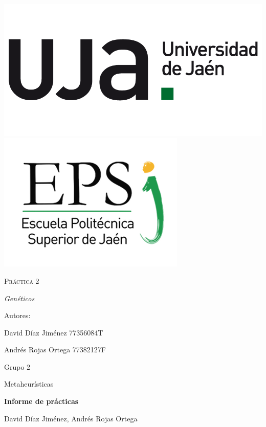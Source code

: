	\begin{titlepage}
		\centering
		{\includegraphics[scale=0.2]{img/np_UJA_generica_6.png}
		\includegraphics[scale=0.35]{img/Logo_EPS.png}}
		\vspace{1cm}
		{\scshape\Huge Práctica 2 \par}
		\vspace{3cm}
		{\itshape\Large Genéticos \par}
		\vfill
		{\Large Autores: \par}
		{\Large David Díaz Jiménez 77356084T \par}
		{\Large Andrés Rojas Ortega 77382127F\par}
		\vfill
		{\Large Grupo 2 \par}
	\end{titlepage}

	\begin{center}
	
	\begin{large}
		
		Metaheurísticas
		
	\end{large}
	
		\vspace*{0.2in}
		\textbf{\large Informe de prácticas}
		
		\vspace*{.2in}
		
		David Díaz Jiménez, Andrés Rojas Ortega
		
		\vspace*{2.5cm}
		
	\end{center}
	
	\tableofcontents
	
	\newpage
